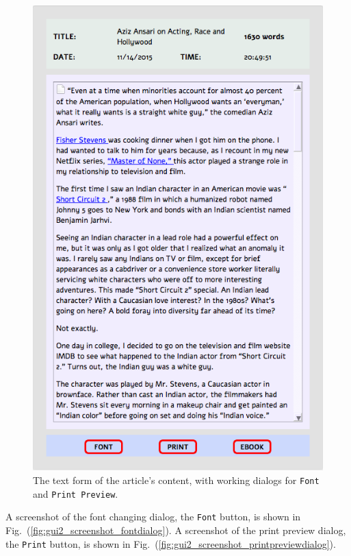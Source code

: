 \documentclass[]{article}
\begin{document}
\begin{figure}[!ht]
{    \includegraphics[width=\linewidth]{images/gui2_screenshot_articletext.png}
    \caption{The text form of the article's content, with working
      dialogs for \texttt{Font} and \texttt{Print
        Preview}.} \label{fig:gui2_screenshot_articletext} }
\end{figure}
A screenshot of the font changing dialog, the {\verb|Font|} button,
is shown in Fig.~(\ref{fig:gui2_screenshot_fontdialog}). A screenshot
of the print preview dialog, the {\verb|Print|} button, is shown in
Fig.~(\ref{fig:gui2_screenshot_printpreviewdialog}).
\end{document}
